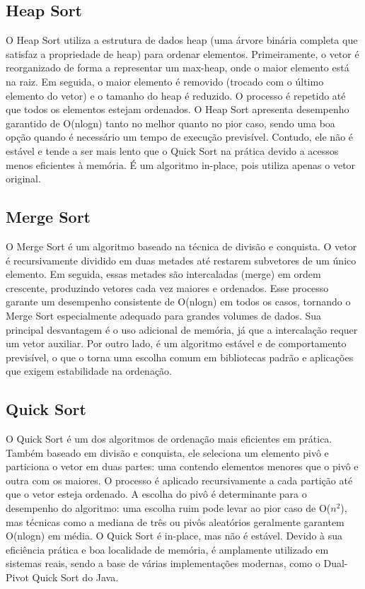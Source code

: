 \documentclass[
	article,			%
	11pt,				%
	oneside,			%
	a4paper,			%
	english,			%
	brazil,				%
	sumario=tradicional
	]{abntex2}
\begin{document}
\subsection{Heap Sort}
O Heap Sort utiliza a estrutura de dados heap (uma árvore binária completa que satisfaz a propriedade de heap) para ordenar elementos. Primeiramente, o vetor é reorganizado de forma a representar um max-heap, onde o maior elemento está na raiz.
Em seguida, o maior elemento é removido (trocado com o último elemento do vetor) e o tamanho do heap é reduzido. O processo é repetido até que todos os elementos estejam ordenados.
O Heap Sort apresenta desempenho garantido de O(nlogn) tanto no melhor quanto no pior caso, sendo uma boa opção quando é necessário um tempo de execução previsível. Contudo, ele não é estável e tende a ser mais lento que o Quick Sort na prática devido a acessos menos eficientes à memória. É um algoritmo in-place, pois utiliza apenas o vetor original.

\subsection{Merge Sort}
O Merge Sort é um algoritmo baseado na técnica de divisão e conquista. O vetor é recursivamente dividido em duas metades até restarem subvetores de um único elemento. Em seguida, essas metades são intercaladas (merge) em ordem crescente, produzindo vetores cada vez maiores e ordenados.
Esse processo garante um desempenho consistente de O(nlogn) em todos os casos, tornando o Merge Sort especialmente adequado para grandes volumes de dados.
Sua principal desvantagem é o uso adicional de memória, já que a intercalação requer um vetor auxiliar. Por outro lado, é um algoritmo estável e de comportamento previsível, o que o torna uma escolha comum em bibliotecas padrão e aplicações que exigem estabilidade na ordenação.

\subsection{Quick Sort}
O Quick Sort é um dos algoritmos de ordenação mais eficientes em prática. Também baseado em divisão e conquista, ele seleciona um elemento pivô e particiona o vetor em duas partes: uma contendo elementos menores que o pivô e outra com os maiores.
O processo é aplicado recursivamente a cada partição até que o vetor esteja ordenado.
A escolha do pivô é determinante para o desempenho do algoritmo: uma escolha ruim pode levar ao pior caso de O($n^2$), mas técnicas como a mediana de três ou pivôs aleatórios geralmente garantem O(nlogn) em média.
O Quick Sort é in-place, mas não é estável. Devido à sua eficiência prática e boa localidade de memória, é amplamente utilizado em sistemas reais, sendo a base de várias implementações modernas, como o Dual-Pivot Quick Sort do Java.
\end{document}
